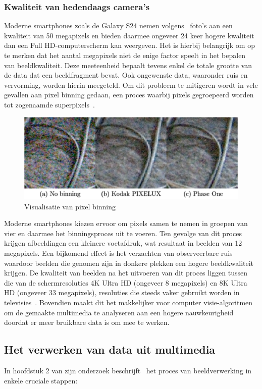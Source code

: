 \subsubsection{Kwaliteit van hedendaags camera's}
Moderne smartphones zoals de Galaxy S24 nemen volgens~\textcite{Samsung2024} foto's aan een kwaliteit van 50 megapixels en bieden daarmee ongeveer 24 keer hogere kwaliteit dan een Full HD-computerscherm kan weergeven.
Het is hierbij belangrijk om op te merken dat het aantal megapixels niet de enige factor speelt in het bepalen van beeldkwaliteit.
Deze meeteenheid bepaalt tevens enkel de totale grootte van de data dat een beeldfragment bevat.
Ook ongewenste data, waaronder ruis en vervorming, worden hierin meegeteld.
Om dit probleem te mitigeren wordt in vele gevallen aan pixel binning gedaan, een proces waarbij pixels gegroepeerd worden tot zogenaamde superpixels~\autocite{Jin2012}.
\begin{figure}
    \includegraphics[width=1\linewidth]{images/pixel-binning}
    \caption{Visualisatie van pixel binning~\autocite{Jin2012}}
    \label{fig:pixel-binning}
\end{figure}
Moderne smartphones kiezen ervoor om pixels samen te nemen in groepen van vier en daarmee het binningsproces uit te voeren.
Ten gevolge van dit proces krijgen afbeeldingen een kleinere voetafdruk, wat resultaat in beelden van 12 megapixels.
Een bijkomend effect is het verzachten van observeerbare ruis waardoor beelden die genomen zijn in donkere plekken een hogere beeldkwaliteit krijgen.
De kwaliteit van beelden na het uitvoeren van dit proces liggen tussen die van de schermresoluties 4K Ultra HD (ongeveer 8 megapixels) en 8K Ultra HD (ongeveer 33 megapixels), resoluties die steeds vaker gebruikt worden in televisies~\autocite{Statista2024}.
Bovendien maakt dit het makkelijker voor computer visie-algoritmen om de gemaakte multimedia te analyseren aan een hogere nauwkeurigheid doordat er meer bruikbare data is om mee te werken.

\subsection{Het verwerken van data uit multimedia}\label{subsec:het-verwerken-van-data}
In hoofdstuk 2 van zijn onderzoek beschrijft~\textcite{Olaoye2024} het proces van beeldverwerking in enkele cruciale stappen:

